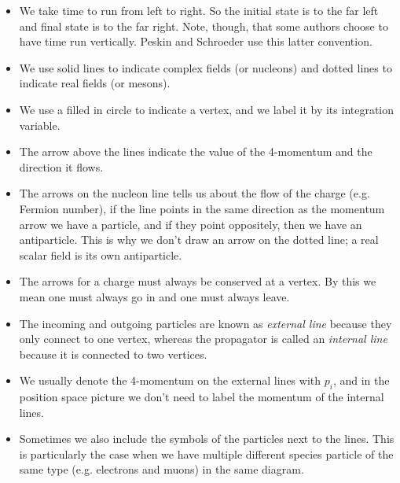 \begin{itemize}
    \item We take time to run from left to right. So the initial state is to the far left and final state is to the far right. Note, though, that some authors choose to have time run vertically. Peskin and Schroeder use this latter convention.
    \item We use solid lines to indicate complex fields (or nucleons) and dotted lines to indicate real fields (or mesons).
    \item We use a filled in circle to indicate a vertex, and we label it by its integration variable.
    \item The arrow above the lines indicate the value of the 4-momentum and the direction it flows.
    \item The arrows on the nucleon line tells us about the flow of the charge (e.g. Fermion number), if the line points in the same direction as the momentum arrow we have a particle, and if they point oppositely, then we have an antiparticle. This is why we don't draw an arrow on the dotted line; a real scalar field is its own antiparticle. 
    \item The arrows for a charge must always be conserved at a vertex. By this we mean one must always go in and one must always leave. 
    \item  The incoming and outgoing particles are known as \textit{external line} because they only connect to one vertex, whereas the propagator is called an \textit{internal line} because it is connected to two vertices. 
    \item We usually denote the 4-momentum on the external lines with $p_i$, and in the position space picture we don't need to label the momentum of the internal lines.  
    \item Sometimes we also include the symbols of the particles next to the lines. This is particularly the case when we have multiple different species particle of the same type (e.g. electrons and muons) in the same diagram.
\end{itemize}

